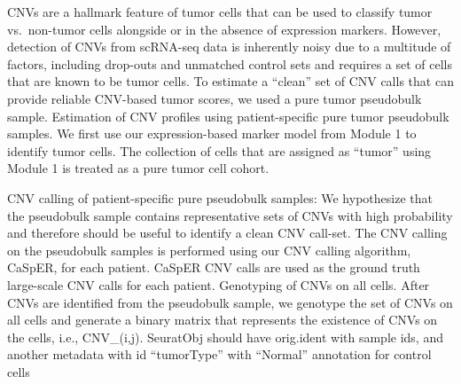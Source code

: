 \documentclass[]{article}
\begin{document}
CNVs are a hallmark feature of tumor cells that can be used to classify tumor vs.~non-tumor cells alongside or in the absence of expression markers. However, detection of CNVs from scRNA-seq data is inherently noisy due to a multitude of factors, including drop-outs and unmatched control sets and requires a set of cells that are known to be tumor cells. To estimate a ``clean'' set of CNV calls that can provide reliable CNV-based tumor scores, we used a pure tumor pseudobulk sample.
Estimation of CNV profiles using patient-specific pure tumor pseudobulk samples. We first use our expression-based marker model from Module 1 to identify tumor cells. The collection of cells that are assigned as ``tumor'' using Module 1 is treated as a pure tumor cell cohort.

CNV calling of patient-specific pure pseudobulk samples: We hypothesize that the pseudobulk sample contains representative sets of CNVs with high probability and therefore should be useful to identify a clean CNV call-set. The CNV calling on the pseudobulk samples is performed using our CNV calling algorithm, CaSpER, for each patient. CaSpER CNV calls are used as the ground truth large-scale CNV calls for each patient.
Genotyping of CNVs on all cells. After CNVs are identified from the pseudobulk sample, we genotype the set of CNVs on all cells and generate a binary matrix that represents the existence of CNVs on the cells, i.e., CNV\_(i,j).
SeuratObj should have orig.ident with sample ids, and another metadata with id ``tumorType'' with ``Normal'' annotation for control cells
\end{document}

